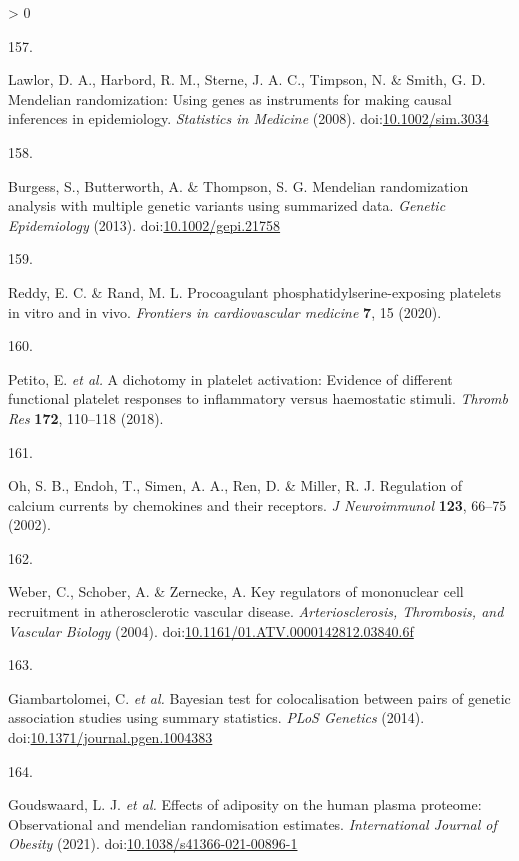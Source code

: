 \documentclass[11pt,twoside]{bristolthesis}
\newlength{\cslhangindent}
\newlength{\csllabelwidth}
\newenvironment{CSLReferences}[2] %
 {%
  \setlength{\parindent}{0pt}
  \ifodd #1 \everypar{\setlength{\hangindent}{\cslhangindent}}\ignorespaces\fi
  \ifnum #2 > 0
  \setlength{\parskip}{#2\baselineskip}
  \fi
 }%
 {}
\newcommand{\CSLLeftMargin}[1]{\parbox[t]{\csllabelwidth}{#1}}
\newcommand{\CSLRightInline}[1]{\parbox[t]{\linewidth - \csllabelwidth}{#1}\break}
\begin{document}
\begin{CSLReferences}{0}{0}
\leavevmode\hypertarget{ref-Lawlor2008}{}%
\CSLLeftMargin{157. }
\CSLRightInline{Lawlor, D. A., Harbord, R. M., Sterne, J. A. C., Timpson, N. \& Smith, G. D. Mendelian randomization: Using genes as instruments for making causal inferences in epidemiology. \emph{Statistics in Medicine} (2008). doi:\href{https://doi.org/10.1002/sim.3034}{10.1002/sim.3034}}

\leavevmode\hypertarget{ref-Burgess2013}{}%
\CSLLeftMargin{158. }
\CSLRightInline{Burgess, S., Butterworth, A. \& Thompson, S. G. Mendelian randomization analysis with multiple genetic variants using summarized data. \emph{Genetic Epidemiology} (2013). doi:\href{https://doi.org/10.1002/gepi.21758}{10.1002/gepi.21758}}

\leavevmode\hypertarget{ref-Reddy2020}{}%
\CSLLeftMargin{159. }
\CSLRightInline{Reddy, E. C. \& Rand, M. L. Procoagulant phosphatidylserine-exposing platelets in vitro and in vivo. \emph{Frontiers in cardiovascular medicine} \textbf{7}, 15 (2020).}

\leavevmode\hypertarget{ref-Petito2018}{}%
\CSLLeftMargin{160. }
\CSLRightInline{Petito, E. \emph{et al.} A dichotomy in platelet activation: Evidence of different functional platelet responses to inflammatory versus haemostatic stimuli. \emph{Thromb Res} \textbf{172}, 110--118 (2018).}

\leavevmode\hypertarget{ref-Oh2002}{}%
\CSLLeftMargin{161. }
\CSLRightInline{Oh, S. B., Endoh, T., Simen, A. A., Ren, D. \& Miller, R. J. Regulation of calcium currents by chemokines and their receptors. \emph{J Neuroimmunol} \textbf{123}, 66--75 (2002).}

\leavevmode\hypertarget{ref-Weber2004}{}%
\CSLLeftMargin{162. }
\CSLRightInline{Weber, C., Schober, A. \& Zernecke, A. Key regulators of mononuclear cell recruitment in atherosclerotic vascular disease. \emph{Arteriosclerosis, Thrombosis, and Vascular Biology} (2004). doi:\href{https://doi.org/10.1161/01.ATV.0000142812.03840.6f}{10.1161/01.ATV.0000142812.03840.6f}}

\leavevmode\hypertarget{ref-Giambartolomei2014}{}%
\CSLLeftMargin{163. }
\CSLRightInline{Giambartolomei, C. \emph{et al.} Bayesian test for colocalisation between pairs of genetic association studies using summary statistics. \emph{PLoS Genetics} (2014). doi:\href{https://doi.org/10.1371/journal.pgen.1004383}{10.1371/journal.pgen.1004383}}

\leavevmode\hypertarget{ref-Goudswaard2021}{}%
\CSLLeftMargin{164. }
\CSLRightInline{Goudswaard, L. J. \emph{et al.} Effects of adiposity on the human plasma proteome: Observational and mendelian randomisation estimates. \emph{International Journal of Obesity} (2021). doi:\href{https://doi.org/10.1038/s41366-021-00896-1}{10.1038/s41366-021-00896-1}}


\end{CSLReferences}
\end{document}
